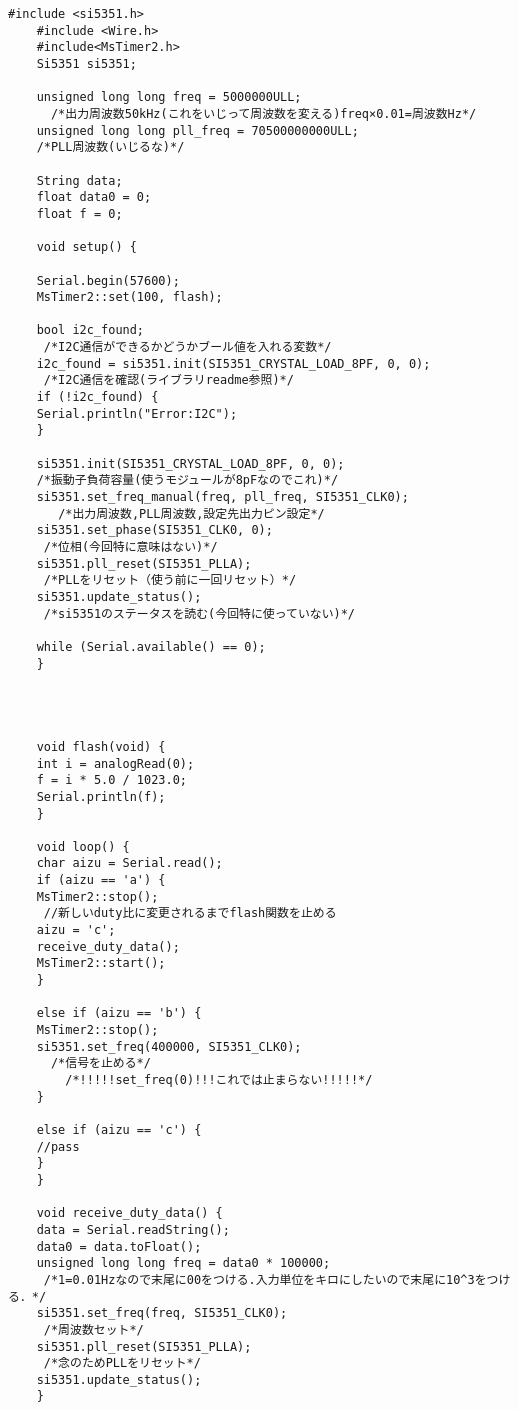 \documentclass[12pt]{jarticle}
\begin{document}
	\begin{lstlisting}[caption=送電側arduino, label=program2]
	#include <si5351.h>
	#include <Wire.h>
	#include<MsTimer2.h>
	Si5351 si5351;
	
	unsigned long long freq = 5000000ULL;         
	  /*出力周波数50kHz(これをいじって周波数を変える)freq×0.01=周波数Hz*/
	unsigned long long pll_freq = 70500000000ULL;   
	/*PLL周波数(いじるな)*/
	
	String data;
	float data0 = 0;
	float f = 0;
	
	void setup() {
	
	Serial.begin(57600);
	MsTimer2::set(100, flash);
	
	bool i2c_found;                                        
	 /*I2C通信ができるかどうかブール値を入れる変数*/
	i2c_found = si5351.init(SI5351_CRYSTAL_LOAD_8PF, 0, 0); 
	 /*I2C通信を確認(ライブラリreadme参照)*/
	if (!i2c_found) {
	Serial.println("Error:I2C");
	}
	
	si5351.init(SI5351_CRYSTAL_LOAD_8PF, 0, 0);             
	/*振動子負荷容量(使うモジュールが8pFなのでこれ)*/
	si5351.set_freq_manual(freq, pll_freq, SI5351_CLK0); 
	   /*出力周波数,PLL周波数,設定先出力ピン設定*/
	si5351.set_phase(SI5351_CLK0, 0);                      
	 /*位相(今回特に意味はない)*/
	si5351.pll_reset(SI5351_PLLA);                         
	 /*PLLをリセット（使う前に一回リセット）*/
	si5351.update_status();                                
	 /*si5351のステータスを読む(今回特に使っていない)*/
	
	while (Serial.available() == 0);
	}
	
	
	
	
	void flash(void) {
	int i = analogRead(0);
	f = i * 5.0 / 1023.0;
	Serial.println(f);
	}
	
	void loop() {
	char aizu = Serial.read();
	if (aizu == 'a') {
	MsTimer2::stop();
	 //新しいduty比に変更されるまでflash関数を止める
	aizu = 'c';
	receive_duty_data();
	MsTimer2::start();
	}
	
	else if (aizu == 'b') {
	MsTimer2::stop();
	si5351.set_freq(400000, SI5351_CLK0);  
	  /*信号を止める*/          
	    /*!!!!!set_freq(0)!!!これでは止まらない!!!!!*/
	}
	
	else if (aizu == 'c') {
	//pass
	}
	}
	
	void receive_duty_data() {
	data = Serial.readString();
	data0 = data.toFloat();
	unsigned long long freq = data0 * 100000;
	 /*1=0.01Hzなので末尾に00をつける.入力単位をキロにしたいので末尾に10^3をつける．*/
	si5351.set_freq(freq, SI5351_CLK0);      
	 /*周波数セット*/
	si5351.pll_reset(SI5351_PLLA);           
	 /*念のためPLLをリセット*/
	si5351.update_status();
	}
	
	\end{lstlisting}
\end{document}
